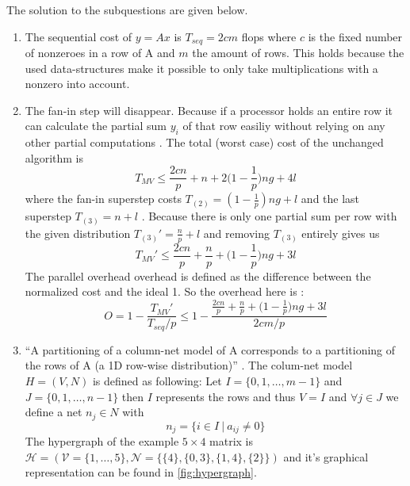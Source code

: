 \documentclass[../main.tex]{subfiles}
\begin{document}
\begin{solution} The solution to the subquestions are given below.
\begin{enumerate}
	\item The sequential cost of $y=Ax$ is $T_{seq} = 2cm$ flops \cite[p.~166]{bisseling04} where $c$ is the fixed number of nonzeroes in a row of A and $m$ the amount of rows. This holds because the used data-structures make it possible to only take multiplications with a nonzero into account.
	\item The fan-in step will disappear. Because if a processor holds an entire row it can calculate the partial sum $y_i$ of that row easiliy without relying on any other partial computations \cite[p.~176]{bisseling04}.  The total (worst case) cost of the unchanged algorithm is
	\begin{equation}
		T_{MV} \leq \frac{2cn}{p} + n + 2 \Big( 1 - \frac{1}{p} \Big) ng + 4l
	\end{equation}
			where the fan-in superstep costs $T_{(2)} = (1-\frac{1}{p})ng + l$ and the last superstep $T_{(3)} = n + l $ \cite[p.~178]{bisseling04}. Because there is only one partial sum per row with the given distribution $T_{(3)}' = \frac{n}{p} + l $ and removing $T_{(3)}$ entirely gives us
			\begin{equation}
				T_{MV}' \leq \frac{2cn}{p} + \frac{n}{p} + \Big(1 - \frac{1}{p} \Big) ng + 3l
			\end{equation}
			The parallel overhead overhead is defined as the difference between the normalized cost and the ideal 1. So the overhead here is \cite[p.~141]{bisseling04}:
			\begin{equation}
				O = 1 - \frac{T_{MV}'}{T_{seq}/p} \leq 1 - \frac{\frac{2cn}{p} + \frac{n}{p} + \Big(1 - \frac{1}{p} \Big) ng + 3l}{2cm/p}
			\end{equation}
	\item ``A partitioning of a column-net model of A corresponds to a partitioning of the rows of A (a 1D row-wise distribution)'' \cite{slides6}. The colum-net model $H=(V,N)$ is defined as following: Let $I = \{0,1,\ldots,m-1\}$ and $J = \{0,1,\ldots,n-1\}$ then $I$ represents the rows and thus $V = I$ and $\forall j \in J$ we define a net $n_j \in N$ with
	\begin{equation}
		n_j = \{i \in I ~|~ a_{ij} \neq 0\}
	\end{equation}
	The hypergraph of the example $5 \times 4$ matrix is $\mathcal{H}=(\mathcal{V} =\{1,\ldots,5\},\mathcal{N} = \{\{4\},\{0, 3\},\{1,4\},\{2\}\})$ and it's graphical representation can be found in \autoref{fig:hypergraph}.


\end{enumerate}
\end{solution}
\end{document}
